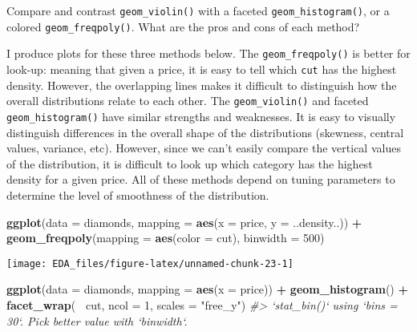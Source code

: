 \documentclass[]{book}
\newenvironment{Shaded}{\begin{snugshade}}{\end{snugshade}}
\newcommand{\CommentTok}[1]{\textcolor[rgb]{0.56,0.35,0.01}{\textit{#1}}}
\newcommand{\DataTypeTok}[1]{\textcolor[rgb]{0.13,0.29,0.53}{#1}}
\newcommand{\DecValTok}[1]{\textcolor[rgb]{0.00,0.00,0.81}{#1}}
\newcommand{\KeywordTok}[1]{\textcolor[rgb]{0.13,0.29,0.53}{\textbf{#1}}}
\newcommand{\NormalTok}[1]{#1}
\newcommand{\OperatorTok}[1]{\textcolor[rgb]{0.81,0.36,0.00}{\textbf{#1}}}
\newcommand{\StringTok}[1]{\textcolor[rgb]{0.31,0.60,0.02}{#1}}
\theoremstyle{plain}
\theoremstyle{remark}
\begin{document}
Compare and contrast \texttt{geom\_violin()} with a faceted
\texttt{geom\_histogram()}, or a colored \texttt{geom\_freqpoly()}. What
are the pros and cons of each method?

I produce plots for these three methods below. The
\texttt{geom\_freqpoly()} is better for look-up: meaning that given a
price, it is easy to tell which \texttt{cut} has the highest density.
However, the overlapping lines makes it difficult to distinguish how the
overall distributions relate to each other. The \texttt{geom\_violin()}
and faceted \texttt{geom\_histogram()} have similar strengths and
weaknesses. It is easy to visually distinguish differences in the
overall shape of the distributions (skewness, central values, variance,
etc). However, since we can't easily compare the vertical values of the
distribution, it is difficult to look up which category has the highest
density for a given price. All of these methods depend on tuning
parameters to determine the level of smoothness of the distribution.

\begin{Shaded}
\begin{Highlighting}[]
\KeywordTok{ggplot}\NormalTok{(}\DataTypeTok{data =}\NormalTok{ diamonds, }\DataTypeTok{mapping =} \KeywordTok{aes}\NormalTok{(}\DataTypeTok{x =}\NormalTok{ price, }\DataTypeTok{y =}\NormalTok{ ..density..)) }\OperatorTok{+}
\StringTok{  }\KeywordTok{geom_freqpoly}\NormalTok{(}\DataTypeTok{mapping =} \KeywordTok{aes}\NormalTok{(}\DataTypeTok{color =}\NormalTok{ cut), }\DataTypeTok{binwidth =} \DecValTok{500}\NormalTok{)}
\end{Highlighting}
\end{Shaded}

\begin{center}\texttt{[image: EDA\_files/figure-latex/unnamed-chunk-23-1]} \end{center}

\begin{Shaded}
\begin{Highlighting}[]
\KeywordTok{ggplot}\NormalTok{(}\DataTypeTok{data =}\NormalTok{ diamonds, }\DataTypeTok{mapping =} \KeywordTok{aes}\NormalTok{(}\DataTypeTok{x =}\NormalTok{ price)) }\OperatorTok{+}
\StringTok{  }\KeywordTok{geom_histogram}\NormalTok{() }\OperatorTok{+}
\StringTok{  }\KeywordTok{facet_wrap}\NormalTok{(}\OperatorTok{~}\StringTok{ }\NormalTok{cut, }\DataTypeTok{ncol =} \DecValTok{1}\NormalTok{, }\DataTypeTok{scales =} \StringTok{"free_y"}\NormalTok{)}
\CommentTok{#> `stat_bin()` using `bins = 30`. Pick better value with `binwidth`.}
\end{Highlighting}
\end{Shaded}
\end{document}
